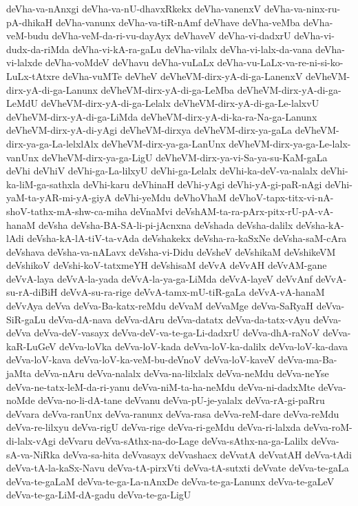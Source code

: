 {deVha-va-nAnxgi
deVha-va-nU-dhavxRkekx
deVha-vanenxV
deVha-va-ninx-ru-pA-dhikaH
deVha-vanunx
deVha-va-tiR-nAmf
deVhave
deVha-veMba
deVha-veM-budu
deVha-veM-da-ri-vu-dayAyx
deVhaveV
deVha-vi-dadxrU
deVha-vi-dudx-da-riMda
deVha-vi-kA-ra-gaLu
deVha-vilalx
deVha-vi-lalx-da-vana
deVha-vi-lalxde
deVha-voMdeV
deVhavu
deVha-vuLaLx
deVha-vu-LaLx-va-re-ni-si-ko-LuLx-tAtxre
deVha-vuMTe
deVheV
deVheVM-dirx-yA-di-ga-LanenxV
deVheVM-dirx-yA-di-ga-Lanunx
deVheVM-dirx-yA-di-ga-LeMba
deVheVM-dirx-yA-di-ga-LeMdU
deVheVM-dirx-yA-di-ga-Lelalx
deVheVM-dirx-yA-di-ga-Le-lalxvU
deVheVM-dirx-yA-di-ga-LiMda
deVheVM-dirx-yA-di-ka-ra-Na-ga-Lanunx
deVheVM-dirx-yA-di-yAgi
deVheVM-dirxya
deVheVM-dirx-ya-gaLa
deVheVM-dirx-ya-ga-La-lelxlAlx
deVheVM-dirx-ya-ga-LanUnx
deVheVM-dirx-ya-ga-Le-lalx-vanUnx
deVheVM-dirx-ya-ga-LigU
deVheVM-dirx-ya-vi-Sa-ya-su-KaM-gaLa
deVhi
deVhiV
deVhi-ga-La-lilxyU
deVhi-ga-Lelalx
deVhi-ka-deV-va-nalalx
deVhi-ka-liM-ga-sathxla
deVhi-karu
deVhinaH
deVhi-yAgi
deVhi-yA-gi-paR-nAgi
deVhi-yaM-ta-yAR-mi-yA-giyA
deVhi-yeMdu
deVhoVhaM
deVhoV-tapx-titx-vi-nA-shoV-tathx-mA-shw-ca-miha
deVnaMvi
deVshAM-ta-ra-pArx-pitx-rU-pA-vA-hanaM
deVsha
deVsha-BA-SA-li-pi-jAcnxna
deVshada
deVsha-dalilx
deVsha-kA-lAdi
deVsha-kA-lA-tiV-ta-vAda
deVshakekx
deVsha-ra-kaSxNe
deVsha-saM-cAra
deVshava
deVsha-va-nALavx
deVsha-vi-Didu
deVsheV
deVshikaM
deVshikeVM
deVshikoV
deVshi-koV-tatxmeYH
deVshisaM
deVvA
deVvAH
deVvAM-gane
deVvA-laya
deVvA-la-yada
deVvA-la-ya-ga-LiMda
deVvA-layeV
deVvAnf
deVvA-su-rA-diBiH
deVvA-su-ra-rige
deVvA-tamx-mU-tiR-gaLa
deVvA-vA-hanaM
deVvAya
deVva
deVva-Ba-katx-reMdu
deVvaM
deVvaMge
deVva-SaRyaH
deVva-SiR-gaLu
deVva-dA-nava
deVva-dAru
deVva-datatx
deVva-da-tatx-vAyu
deVva-deVva
deVva-deV-vasayx
deVva-deV-va-te-ga-Li-dadxrU
deVva-dhA-raNoV
deVva-kaR-LuGeV
deVva-loVka
deVva-loV-kada
deVva-loV-ka-dalilx
deVva-loV-ka-dava
deVva-loV-kava
deVva-loV-ka-veM-bu-deVnoV
deVva-loV-kaveV
deVva-ma-Ba-jaMta
deVva-nAru
deVva-nalalx
deVva-na-lilxlalx
deVva-neMdu
deVva-neYse
deVva-ne-tatx-leM-da-ri-yanu
deVva-niM-ta-ha-neMdu
deVva-ni-dadxMte
deVva-noMde
deVva-no-li-dA-tane
deVvanu
deVva-pU-je-yalalx
deVva-rA-gi-paRru
deVvara
deVva-ranUnx
deVva-ranunx
deVva-rasa
deVva-reM-dare
deVva-reMdu
deVva-re-lilxyu
deVva-rigU
deVva-rige
deVva-ri-geMdu
deVva-ri-lalxda
deVva-roM-di-lalx-vAgi
deVvaru
deVva-sAthx-na-do-Lage
deVva-sAthx-na-ga-Lalilx
deVva-sA-va-NiRka
deVva-sa-hita
deVvasayx
deVvashacx
deVvatA
deVvatAH
deVva-tAdi
deVva-tA-la-kaSx-Navu
deVva-tA-pirxVti
deVva-tA-sutxti
deVvate
deVva-te-gaLa
deVva-te-gaLaM
deVva-te-ga-La-nAnxDe
deVva-te-ga-Lanunx
deVva-te-gaLeV
deVva-te-ga-LiM-dA-gadu
deVva-te-ga-LigU
}
